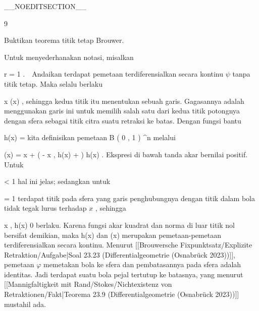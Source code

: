 __NOEDITSECTION__

{9}

{

Buktikan teorema titik tetap Brouwer.

}
{

Untuk menyederhanakan notasi, misalkan

\mavergleichskette
{\vergleichskette
{ r
}
{ = }{ 1
}
{ }{
}
{ }{
}
{ }{
}
}
{}{}{.}  Andaikan terdapat pemetaan terdiferensialkan secara kontinu $\psi$ tanpa titik tetap. Maka selalu berlaku

\mavergleichskettedisp
{\vergleichskette
{ x
}
{ \neq} { \psi(x)
}
{ } {
}
{ } {
}
{ } {
}
}
{}{}{,}
sehingga kedua titik itu menentukan sebuah garis. Gagasannya adalah menggunakan garis ini untuk memilih
 {} {}
salah satu dari kedua titik potongnya dengan sfera sebagai titik citra suatu retraksi ke batas. Dengan fungsi bantu

\mavergleichskettedisp
{\vergleichskette
{ h(x)
}
{ =} { {  }
}
{ } {
}
{ } {
}
{ } {
}
}
{}{}{}
kita definisikan pemetaan
\maabbdisp {\varphi} { B \left( 0 , 1 \right) } { \R^n
} {}
melalui

\mavergleichskettedisphandlinks
{\vergleichskettedisphandlinks
{ \varphi(x)
}
{ =} { x + \left(  - \left\langle  x  , h(x)  \right\rangle +   \right) \cdot h(x)
}
{ } {
}
{ } {
}
{ } {
}
}
{}{}{.}
Ekspresi di bawah tanda akar bernilai positif. Untuk

\mavergleichskette
{\vergleichskette
{  \Vert
}
{ < }{ 1
}
{ }{
}
{ }{
}
{ }{
}
}
{}{}{}
hal ini jelas; sedangkan untuk

\mavergleichskette
{\vergleichskette
{  \Vert
}
{ = }{ 1
}
{ }{
}
{ }{
}
{ }{
}
}
{}{}{}
terdapat titik pada sfera yang garis penghubungnya dengan titik dalam bola
 tidak tegak lurus terhadap $x$
 {} {,}
sehingga

\mavergleichskettedisp
{\vergleichskette
{ \left\langle x , h(x) \right\rangle
}
{ \neq} { 0
}
{ } {
}
{ } {
}
{ } {
}
}
{}{}{}
berlaku. Karena fungsi akar kuadrat dan norma di luar titik nol
bersifat demikian, maka
\mathkor {} {h(x)} {dan} {\varphi(x)} {}
merupakan pemetaan-pemetaan terdiferensialkan secara kontinu. Menurut
[[Brouwersche Fixpunktsatz/Explizite Retraktion/Aufgabe|Soal 23.23 (Differentialgeometrie (Osnabrück 2023))]],
pemetaan $\varphi$ memetakan bola ke sfera dan pembatasannya pada sfera adalah identitas. Jadi terdapat suatu
bola pejal tertutup ke batasnya, yang menurut
[[Mannigfaltigkeit mit Rand/Stokes/Nichtexistenz von Retraktionen/Fakt|Teorema 23.9 (Differentialgeometrie (Osnabrück 2023))]]
mustahil ada.

 }

